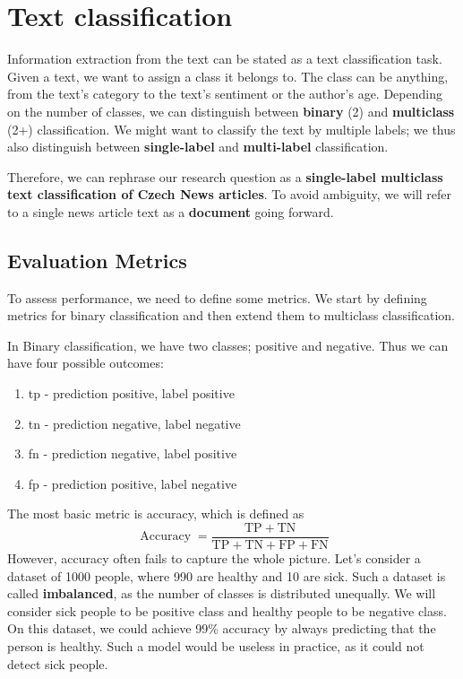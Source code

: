 \chapter{Text classification}
Information extraction from the text can be stated as a text classification task.
Given a text, we want to assign a class it belongs to.
The class can be anything, from the text's category to the text's sentiment or the author's age.
Depending on the number of classes, we can distinguish between \textbf{binary} (2) and \textbf{multiclass} (2+) classification.
We might want to classify the text by multiple labels; we thus also distinguish between \textbf{single-label}
and \textbf{multi-label} classification.

Therefore, we can rephrase our research question as a \textbf{single-label multiclass text classification of Czech News articles}.
To avoid ambiguity, we will refer to a single news article text as a \textbf{document} going forward.

\section{Evaluation Metrics}
\label{sec:metrics}
To assess performance, we need to define some metrics.
We start by defining metrics for binary classification and then extend them to multiclass classification.

In Binary classification, we have two classes; positive and negative. Thus we can have four possible outcomes:
\begin{enumerate}
    \item \ac{tp} - prediction positive, label positive
    \item \ac{tn} - prediction negative, label negative
    \item \ac{fn} - prediction negative, label positive
    \item \ac{fp} - prediction positive, label negative
\end{enumerate}

The most basic metric is accuracy, which is defined as
\begin{equation*}
    \label{eq:accuracy}
    \operatorname{Accuracy} = \frac{\mathrm{TP} + \mathrm{TN}}{\mathrm{TP} + \mathrm{TN} + \mathrm{FP} + \mathrm{FN}}
\end{equation*}
However, accuracy often fails to capture the whole picture.
Let's consider a dataset of 1000 people, where 990 are healthy and 10 are sick.
Such a dataset is called \textbf{imbalanced}, as the number of classes is distributed unequally.
We will consider sick people to be positive class and healthy people to be negative class.
On this dataset, we could achieve 99\% accuracy by always predicting that the person is healthy.
Such a model would be useless in practice, as it could not detect sick people.

